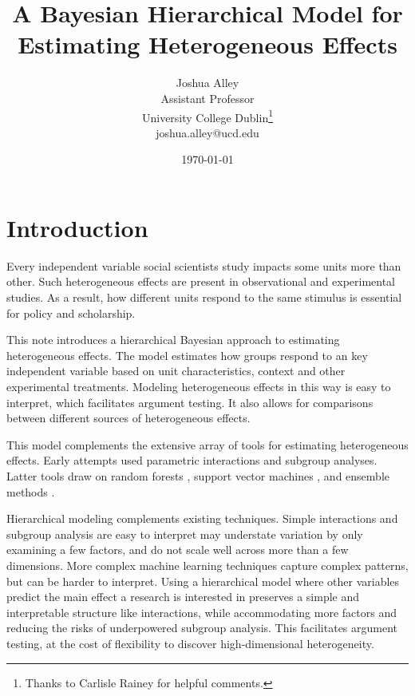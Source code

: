 \documentclass[12pt]{article}
\title{\textbf{A Bayesian Hierarchical Model for Estimating Heterogeneous Effects}}
\author{Joshua Alley \\
Assistant Professor \\
University College Dublin\thanks{Thanks to Carlisle Rainey for helpful comments.} \\
joshua.alley@ucd.edu
}
\date{\today}
\begin{document}
\maketitle 

\begin{abstract} 

\end{abstract} 


\newpage 
\doublespace 


\section{Introduction}


Every independent variable social scientists study impacts some units more than other. 
Such heterogeneous effects are present in observational and experimental studies. 
As a result, how different units respond to the same stimulus is essential for policy and scholarship. 


This note introduces a hierarchical Bayesian approach to estimating heterogeneous effects. 
The model estimates how groups respond to an key independent variable based on unit characteristics, context and other experimental treatments.
Modeling heterogeneous effects in this way is easy to interpret, which facilitates argument testing. 
It also allows for comparisons between different sources of heterogeneous effects. 


This model complements the extensive array of tools for estimating heterogeneous effects. 
Early attempts used parametric interactions and subgroup analyses. 
Latter tools draw on random forests \citep{GreenKern2012, WagerAthey2018}, support vector machines \citep{ImaiRatkovic2013}, and ensemble methods \citep{Grimmeretal2017, Kunzeletal2019}. 


Hierarchical modeling complements existing techniques. 
Simple interactions and subgroup analysis are easy to interpret may understate variation by only examining a few factors, and do not scale well across more than a few dimensions. 
More complex machine learning techniques capture complex patterns, but can be harder to interpret. 
Using a hierarchical model where other variables predict the main effect a research is interested in preserves a simple and interpretable structure like interactions, while accommodating more factors and reducing the risks of underpowered subgroup analysis. 
This facilitates argument testing, at the cost of flexibility to discover high-dimensional heterogeneity. 
\end{document}
